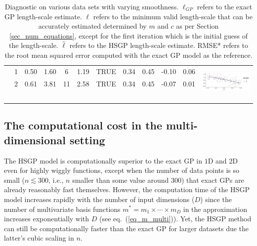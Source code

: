 \begin{table}
\begin{tabular}{ c c c c c c c c c c | c c}
 & 1 & 0.50 & 1.60 & 6 & 1.19 & TRUE & 0.34 & 0.45 & -0.10 & 0.06 & \multirow{6}{*}{ \includegraphics[scale=0.25, trim = 0mm 10mm 0mm 3mm, clip]{tab1_diagnostic_8.png}}\\
 & 2 & 0.61 & 3.81 & 11 & 2.58 & TRUE & 0.34 & 0.45 & -0.07 & 0.01 & \\
 \\
 \\
 \\
 \\[1mm]
\arrayrulecolor{gray}\hline
\end{tabular}
\caption{Diagnostic on various data sets with varying smoothness. $\ell_{GP}$ refers to the exact GP length-scale estimate. $\ell$ refers to the minimum valid length-scale that can be accurately estimated determined by $m$ and $c$ as per Section \ref{sec_num_equations}, except for the first iteration which is the initial guess of the length-scale. $\hat{\ell}$ refers to the HSGP length-scale estimate. RMSE* refers to the root mean squared error computed with the exact GP model as the reference.}
  \label{tab1_diagnostic}
\end{table}


\subsection{The computational cost in the multi-dimensional setting}\label{sec_cost_multi}

The HSGP model is computationally superior {\color{blue} to the exact GP} in $1$D and $2$D even for highly wiggly functions, except when the number of data points is so small ($n \lesssim 300$, i.e., $n$ smaller than some value around 300) that exact GPs are already reasonably fast themselves. However, the computation time of the HSGP model increases rapidly with the number of input dimensions ($D$) since the number of multivariate basis functions $m^*=m_1\times \cdots \times m_D$ in the approximation increases exponentially with $D$ (see eq.~(\ref{eq_m_multi})). Yet, the HSGP method can still be computationally faster than the exact GP for larger datasets due the latter's cubic scaling in $n$. 

